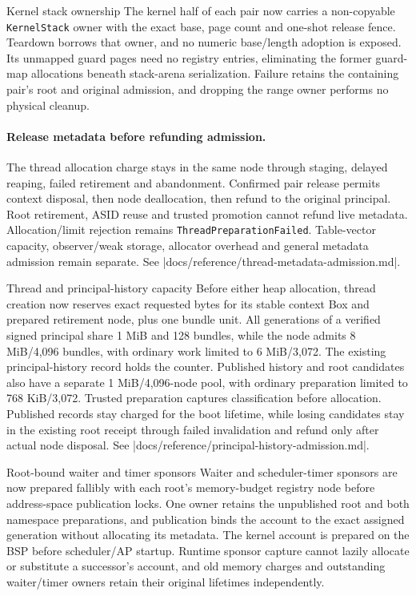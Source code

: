 \begin{implementationdetail}{Kernel stack ownership}
The kernel half of each pair now carries a non-copyable \texttt{KernelStack}
owner with the exact base, page count and one-shot release fence. Teardown
borrows that owner, and no numeric base/length adoption is exposed. Its unmapped
guard pages need no registry entries, eliminating the former guard-map
allocations beneath stack-arena serialization. Failure retains the containing
pair's root and original admission, and dropping the range owner performs no
physical cleanup.
\end{implementationdetail}

\paragraph*{Release metadata before refunding admission.}

The thread allocation charge stays in the same node through staging, delayed
reaping, failed retirement and abandonment.
Confirmed pair release permits context disposal, then node deallocation, then
refund to the original principal. Root retirement, ASID reuse and trusted
promotion cannot refund live metadata. Allocation/limit rejection remains
\texttt{ThreadPreparationFailed}. Table-vector capacity, observer/weak storage,
allocator overhead and general metadata admission remain separate. See
\repofile|docs/reference/thread-metadata-admission.md|.

\begin{implementationdetail}{Thread and principal-history capacity}
Before either heap allocation, thread creation now reserves exact requested
bytes for its stable context Box and prepared retirement node, plus one bundle
unit. All generations of a verified signed principal share 1 MiB and 128 bundles, while
the node admits 8 MiB/4,096 bundles, with ordinary work limited to 6 MiB/3,072.
The existing principal-history record holds the counter. Published history and
root candidates also have a separate 1 MiB/4,096-node pool, with ordinary
preparation limited to 768 KiB/3,072. Trusted preparation captures classification
before allocation. Published records stay charged for the boot lifetime, while losing
candidates stay in the existing root receipt through failed invalidation and
refund only after actual node disposal. See
\repofile|docs/reference/principal-history-admission.md|.
\end{implementationdetail}

\begin{implementationdetail}{Root-bound waiter and timer sponsors}
Waiter and scheduler-timer sponsors are now prepared fallibly with each root's
memory-budget registry node before address-space publication locks. One owner
retains the unpublished root and both namespace preparations, and publication binds
the account to the exact assigned generation without allocating its metadata.
The kernel account is prepared on the BSP before scheduler/AP startup. Runtime
sponsor capture cannot lazily allocate or substitute a successor's account, and
old memory charges and outstanding waiter/timer owners retain their original
lifetimes independently.
\end{implementationdetail}

